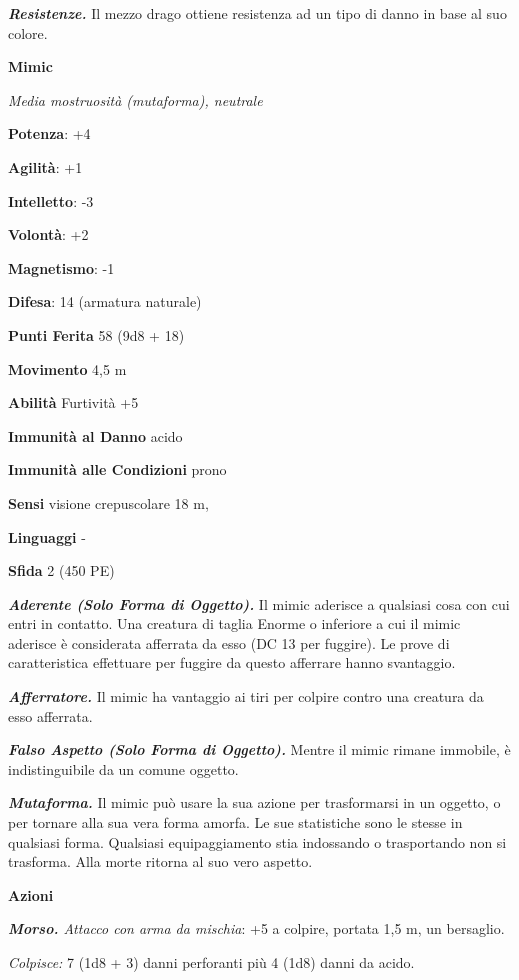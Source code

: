 \begin{multicols}{2}
\emph{\textbf{Resistenze.}} Il mezzo drago ottiene resistenza ad un tipo
di danno in base al suo colore.

\textbf{Mimic}

\emph{Media mostruosità (mutaforma), neutrale}

\textbf{Potenza}: +4

\textbf{Agilità}: +1

\textbf{Intelletto}: -3

\textbf{Volontà}: +2

\textbf{Magnetismo}: -1

\textbf{Difesa}: 14 (armatura naturale)

\textbf{Punti Ferita} 58 (9d8 + 18)

\textbf{Movimento} 4,5 m

\textbf{Abilità} Furtività +5

\textbf{Immunità al Danno} acido

\textbf{Immunità alle Condizioni} prono

\textbf{Sensi} visione crepuscolare 18 m, 

\textbf{Linguaggi} -

\textbf{Sfida} 2 (450 PE)

\emph{\textbf{Aderente (Solo Forma di Oggetto).}} Il mimic aderisce a
qualsiasi cosa con cui entri in contatto. Una creatura di taglia Enorme
o inferiore a cui il mimic aderisce è considerata afferrata da esso (DC
13 per fuggire). Le prove di caratteristica effettuare per fuggire da
questo afferrare hanno svantaggio.

\emph{\textbf{Afferratore.}} Il mimic ha vantaggio ai tiri per colpire
contro una creatura da esso afferrata.

\emph{\textbf{Falso Aspetto (Solo Forma di Oggetto).}} Mentre il mimic
rimane immobile, è indistinguibile da un comune oggetto.

\emph{\textbf{Mutaforma.}} Il mimic può usare la sua azione per
trasformarsi in un oggetto, o per tornare alla sua vera forma amorfa. Le
sue statistiche sono le stesse in qualsiasi forma. Qualsiasi
equipaggiamento stia indossando o trasportando non si trasforma. Alla
morte ritorna al suo vero aspetto.

\textbf{Azioni}

\emph{\textbf{Morso.} Attacco con arma da mischia}: +5 a colpire,
portata 1,5 m, un bersaglio.

\emph{Colpisce:} 7 (1d8 + 3) danni perforanti più 4 (1d8) danni da
acido.


\end{multicols}
